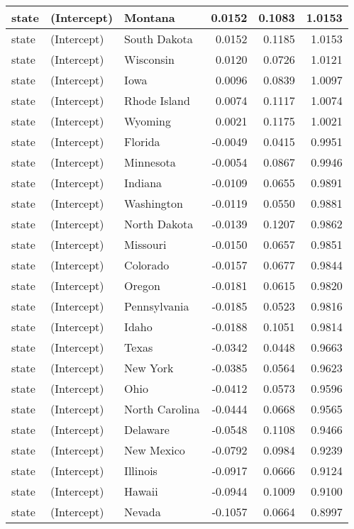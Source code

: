\documentclass[
  11pt,
]{article}
\begin{document}
\begin{longtable}[t]{l|l|l|r|r|r}
\hline
state & (Intercept) & Montana & 0.0152 & 0.1083 & 1.0153\\
\hline
state & (Intercept) & South Dakota & 0.0152 & 0.1185 & 1.0153\\
\hline
state & (Intercept) & Wisconsin & 0.0120 & 0.0726 & 1.0121\\
\hline
state & (Intercept) & Iowa & 0.0096 & 0.0839 & 1.0097\\
\hline
state & (Intercept) & Rhode Island & 0.0074 & 0.1117 & 1.0074\\
\hline
state & (Intercept) & Wyoming & 0.0021 & 0.1175 & 1.0021\\
\hline
state & (Intercept) & Florida & -0.0049 & 0.0415 & 0.9951\\
\hline
state & (Intercept) & Minnesota & -0.0054 & 0.0867 & 0.9946\\
\hline
state & (Intercept) & Indiana & -0.0109 & 0.0655 & 0.9891\\
\hline
state & (Intercept) & Washington & -0.0119 & 0.0550 & 0.9881\\
\hline
state & (Intercept) & North Dakota & -0.0139 & 0.1207 & 0.9862\\
\hline
state & (Intercept) & Missouri & -0.0150 & 0.0657 & 0.9851\\
\hline
state & (Intercept) & Colorado & -0.0157 & 0.0677 & 0.9844\\
\hline
state & (Intercept) & Oregon & -0.0181 & 0.0615 & 0.9820\\
\hline
state & (Intercept) & Pennsylvania & -0.0185 & 0.0523 & 0.9816\\
\hline
state & (Intercept) & Idaho & -0.0188 & 0.1051 & 0.9814\\
\hline
state & (Intercept) & Texas & -0.0342 & 0.0448 & 0.9663\\
\hline
state & (Intercept) & New York & -0.0385 & 0.0564 & 0.9623\\
\hline
state & (Intercept) & Ohio & -0.0412 & 0.0573 & 0.9596\\
\hline
state & (Intercept) & North Carolina & -0.0444 & 0.0668 & 0.9565\\
\hline
state & (Intercept) & Delaware & -0.0548 & 0.1108 & 0.9466\\
\hline
state & (Intercept) & New Mexico & -0.0792 & 0.0984 & 0.9239\\
\hline
state & (Intercept) & Illinois & -0.0917 & 0.0666 & 0.9124\\
\hline
state & (Intercept) & Hawaii & -0.0944 & 0.1009 & 0.9100\\
\hline
state & (Intercept) & Nevada & -0.1057 & 0.0664 & 0.8997\\

\end{longtable}
\end{document}
